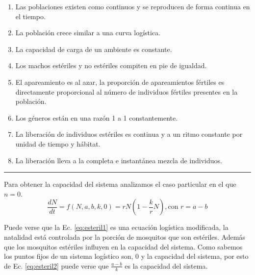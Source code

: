 \documentclass[twocolumn,aps,prl]{revtex4-1}
\newcommand*\sepline{%
  \begin{center}
    \rule[1ex]{.5\textwidth}{.5pt}
  \end{center}}
\begin{document}
\begin{enumerate}[label=\alph*)]
    \item Las poblaciones existen como continuos y se reproducen de forma continua en el tiempo.
    \item La población crece similar a una curva logística.
    \item La capacidad de carga de un ambiente es constante.
    \item Los machos estériles y no estériles compiten en pie de igualdad.
    \item El apareamiento es al azar, la proporción de apareamientos fértiles es directamente proporcional al número de individuos fértiles presentes en la población.
    \item Los géneros están en una razón 1 a 1 constantemente.
    \item La liberación de individuos estériles es continua y a un ritmo constante por unidad de tiempo y hábitat.
    \item La liberación lleva a la completa e instantánea mezcla de individuos.
\end{enumerate}

\sepline

Para obtener la capacidad del sistema analizamos el caso particular en el que $n=0$. 
\begin{equation}\label{eq:esteril2}
    \frac{d N}{d t} = f(N,a,b,k,0) 
    = 
    rN(1-\frac{k}{r}N)
    , \text{con } r = a-b
\end{equation}

Puede verse que la Ec. \ref{eq:esteril1} es una ecuación logística modificada, la natalidad está controlada por la porción de mosquitos que son estériles. Además que los mosquitos estériles influyen en la capacidad del sistema. Como sabemos los puntos fijos de un sistema logístico son, 0 y la capacidad del sistema, por esto de Ec. \ref{eq:esteril2} puede verse que $\frac{a-b}{k}$ es la capacidad del sistema.
\end{document}
